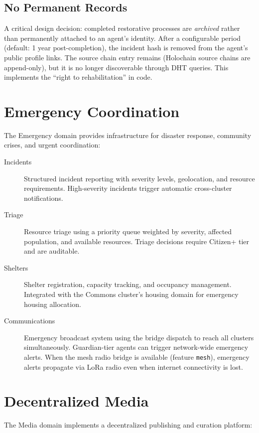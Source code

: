 \documentclass[12pt]{book}
\begin{document}
\subsection{No Permanent Records}

A critical design decision: completed restorative processes are
\emph{archived} rather than permanently attached to an agent's identity.
After a configurable period (default: 1 year post-completion), the
incident hash is removed from the agent's public profile links. The
source chain entry remains (Holochain source chains are append-only),
but it is no longer discoverable through DHT queries. This implements
the ``right to rehabilitation'' in code.

\section{Emergency Coordination}

The Emergency domain provides infrastructure for disaster response,
community crises, and urgent coordination:

\begin{description}
  \item[Incidents] Structured incident reporting with severity levels,
    geolocation, and resource requirements. High-severity incidents
    trigger automatic cross-cluster notifications.
  \item[Triage] Resource triage using a priority queue weighted by
    severity, affected population, and available resources. Triage
    decisions require Citizen+ tier and are auditable.
  \item[Shelters] Shelter registration, capacity tracking, and
    occupancy management. Integrated with the Commons cluster's housing
    domain for emergency housing allocation.
  \item[Communications] Emergency broadcast system using the bridge
    dispatch to reach all clusters simultaneously. Guardian-tier agents
    can trigger network-wide emergency alerts. When the mesh radio
    bridge is available (feature \texttt{mesh}), emergency alerts
    propagate via LoRa radio even when internet connectivity is lost.
\end{description}

\section{Decentralized Media}

The Media domain implements a decentralized publishing and curation platform:
\end{document}

